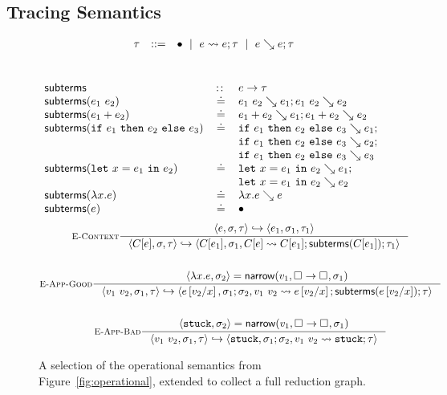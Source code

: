 \subsection{Tracing Semantics}
\label{sec:inter-semant}
%
\begin{figure*}[t]
$$
\begin{array}{rrcl}
  & \tau & ::= & \bullet \ \mid \  e \leadsto e; \tau \ \mid \  e \searrow e; \tau
\end{array}
$$
\\
\relDescription{\subtermssym}
\begin{gather*}
\begin{array}{lcl}
\mathsf{subterms}                 & \colon\!\!\colon & e \to \tau \\
\mathsf{subterms}(e_1 \ e_2)   & \doteq & e_1 \ e_2 \searrow e_1; e_1 \ e_2 \searrow e_2 \\
\mathsf{subterms}(e_1 + e_2)   & \doteq & e_1 + e_2 \searrow e_1; e_1 + e_2 \searrow e_2 \\
\mathsf{subterms}(\mathtt{if}\ e_1\ \mathtt{then}\ e_2\ \mathtt{else}\ e_3)   & \doteq & \mathtt{if}\ e_1\ \mathtt{then}\ e_2\ \mathtt{else}\ e_3 \searrow e_1; \\
                                &        & \mathtt{if}\ e_1\ \mathtt{then}\ e_2\ \mathtt{else}\ e_3 \searrow e_2; \\
                                &        & \mathtt{if}\ e_1\ \mathtt{then}\ e_2\ \mathtt{else}\ e_3 \searrow e_3 \\
\mathsf{subterms}(\mathtt{let}\ x = e_1\ \mathtt{in}\ e_2)   & \doteq & \mathtt{let}\ x = e_1\ \mathtt{in}\ e_2 \searrow e_1; \\
                                &        & \mathtt{let}\ x = e_1\ \mathtt{in}\ e_2 \searrow e_2 \\
\mathsf{subterms}(\lambda x. e)       & \doteq & \lambda x. e \searrow e \\
\mathsf{subterms}(e)                 & \doteq & \bullet
\end{array}
\end{gather*}
\begin{gather*}
\inference[\recontext]
  {\stepg{e}{\su}{\tr}{e_1}{\su_1}{\tr_1}}
  {\stepg{C[e]}{\su}{\tr}{C[e_1]}{\su_1}{\singlestep{C[e]}{C[e_1]}; \subterms{C[e_1]}; \tr_1}}
\\ \\
\inference[\reappgood]
  {\pair{\efun{x}{e}}{\su_2} = \force{v_1}{\tfun{\thole{}}{\thole{}}}{\su_1}}
  {\stepg{\eapp{v_1}{v_2}}{\su_1}{\tr}
         {e\sub{x}{v_2}}{\su_1;\su_2}{\singlestep{\eapp{v_1}{v_2}}{e\sub{x}{v_2}}; \subterms{e\sub{x}{v_2}}; \tr}}
\\ \\
\inference[\reappbad]
  {\pair{\stuck}{\su_2} = \force{v_1}{\tfun{\thole{}}{\thole{}}}{\su_1}}
  {\stepg{\eapp{v_1}{v_2}}{\su_1}{\tr}{\stuck}{\su_1;\su_2}{\singlestep{\eapp{v_1}{v_2}}{\stuck}; \tr}}
\end{gather*}
\caption{A selection of the operational semantics from
  Figure~\ref{fig:operational}, extended to collect a full reduction
  graph.}
\label{fig:interactive}
\end{figure*}
